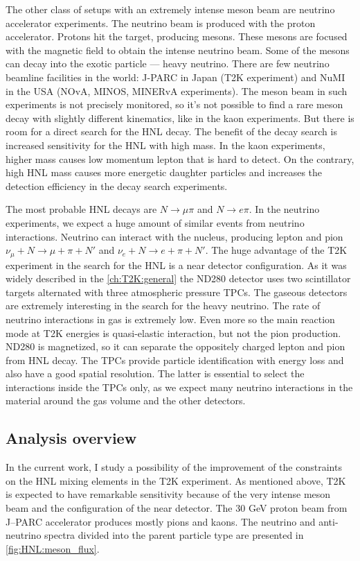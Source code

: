 \documentclass[../main.tex]{subfiles}
\begin{document}
The other class of setups with an extremely intense meson beam are neutrino accelerator experiments. The neutrino beam is produced with the proton accelerator. Protons hit the target, producing mesons. These mesons are focused with the magnetic field to obtain the intense neutrino beam. Some of the mesons can decay into the exotic particle --- heavy neutrino. There are few neutrino beamline facilities in the world: J-PARC in Japan (T2K experiment) and NuMI in the USA (NOvA, MINOS, MINERvA experiments). The meson beam in such experiments is not precisely monitored, so it's not possible to find a rare meson decay with slightly different kinematics, like in the kaon experiments. But there is room for a direct search for the HNL decay. The benefit of the decay search is increased sensitivity for the HNL with high mass. In the kaon experiments, higher mass causes low momentum lepton that is hard to detect. On the contrary, high HNL mass causes more energetic daughter particles and increases the detection efficiency in the decay search experiments.

The most probable HNL decays are $N\to\mu\pi$ and $N\to e\pi$. In the neutrino experiments, we expect a huge amount of similar events from neutrino interactions. Neutrino can interact with the nucleus, producing lepton and pion $\nu_\mu+N\to\mu+\pi+N'$ and $\nu_e+N\to e+\pi+N'$. The huge advantage of the T2K experiment in the search for the HNL is a near detector configuration. As it was widely described in the \autoref{ch:T2K:general} the ND280 detector uses two scintillator targets alternated with three atmospheric pressure TPCs. The gaseous detectors are extremely interesting in the search for the heavy neutrino. The rate of neutrino interactions in gas is extremely low. Even more so the main reaction mode at T2K energies is quasi-elastic interaction, but not the pion production. ND280 is magnetized, so it can separate the oppositely charged lepton and pion from HNL decay. The TPCs provide particle identification with energy loss and also have a good spatial resolution. The latter is essential to select the interactions inside the TPCs only, as we expect many neutrino interactions in the material around the gas volume and the other detectors.

\subsection{Analysis overview}
In the current work, I study a possibility of the improvement of the constraints on the HNL mixing elements in the T2K experiment. As mentioned above, T2K is expected to have remarkable sensitivity because of the very intense meson beam and the configuration of the near detector. The 30 GeV proton beam from J--PARC accelerator produces mostly pions and kaons. The neutrino and anti-neutrino spectra divided into the parent particle type are presented in \autoref{fig:HNL:meson_flux}.
\end{document}
